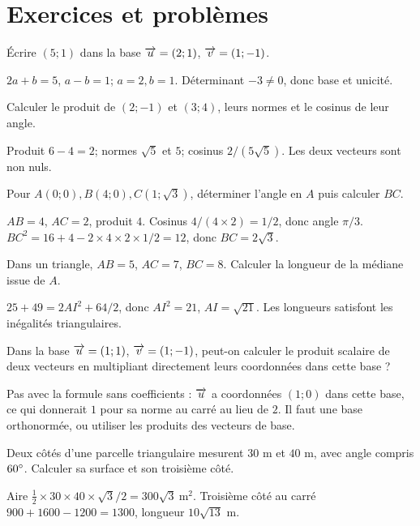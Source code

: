 \section{Exercices et problèmes}
\label{t11s-c13-e01}
Écrire $(5;1)$ dans la base $\overrightarrow{u}=(2;1)$, $\overrightarrow{v}=(1;-1)$.
\begin{corrige}\label{sol-t11s-c13-e01}
$2a+b=5$, $a-b=1$; $a=2,b=1$. Déterminant $-3\ne0$, donc base et unicité.
\end{corrige}
\label{t11s-c13-e02}
Calculer le produit de $(2;-1)$ et $(3;4)$, leurs normes et le cosinus de leur angle.
\begin{corrige}\label{sol-t11s-c13-e02}
Produit $6-4=2$; normes $\sqrt5$ et $5$; cosinus $2/(5\sqrt5)$. Les deux vecteurs sont non nuls.
\end{corrige}
\label{t11s-c13-e03}
Pour $A(0;0),B(4;0),C(1;\sqrt3)$, déterminer l’angle en $A$ puis calculer $BC$.
\begin{corrige}\label{sol-t11s-c13-e03}
$AB=4$, $AC=2$, produit $4$. Cosinus $4/(4\times2)=1/2$, donc angle $\pi/3$. $BC^2=16+4-2\times4\times2\times1/2=12$, donc $BC=2\sqrt3$.
\end{corrige}
\exo[Médiane]\label{t11s-c13-e04}
Dans un triangle, $AB=5$, $AC=7$, $BC=8$. Calculer la longueur de la médiane issue de $A$.
\begin{corrige}\label{sol-t11s-c13-e04}
$25+49=2AI^2+64/2$, donc $AI^2=21$, $AI=\sqrt{21}$. Les longueurs satisfont les inégalités triangulaires.
\end{corrige}
\label{t11s-c13-e05}
Dans la base $\overrightarrow{u}=(1;1)$, $\overrightarrow{v}=(1;-1)$, peut-on calculer le produit scalaire de deux vecteurs en multipliant directement leurs coordonnées dans cette base ?
\begin{corrige}\label{sol-t11s-c13-e05}
Pas avec la formule sans coefficients : $\overrightarrow{u}$ a coordonnées $(1;0)$ dans cette base, ce qui donnerait $1$ pour sa norme au carré au lieu de $2$. Il faut une base orthonormée, ou utiliser les produits des vecteurs de base.
\end{corrige}
\label{t11s-c13-e06}
Deux côtés d’une parcelle triangulaire mesurent $30$ m et $40$ m, avec angle compris $60^{\circ}$. Calculer sa surface et son troisième côté.
\begin{corrige}\label{sol-t11s-c13-e06}
Aire $\tfrac12\times30\times40\times\sqrt3/2=300\sqrt3\ \mathrm{m}^2$. Troisième côté au carré $900+1600-1200=1300$, longueur $10\sqrt{13}$ m.
\end{corrige}

